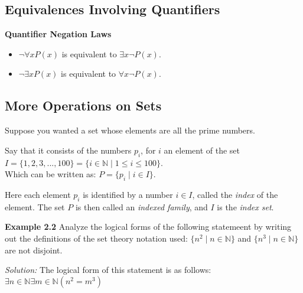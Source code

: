 \documentclass[11pt]{article}
\begin{document}
\subsection{Equivalences Involving Quantifiers}
\textbf{Quantifier Negation Laws}
\begin{itemize}
    \item $\neg\forall x P(x)$ is equivalent to $\exists x \neg P(x)$.
    \item $\neg\exists x P(x)$ is equivalent to $\forall x \neg P(x)$.
\end{itemize}

\subsection{More Operations on Sets}
Suppose you wanted a set whose elements are all the prime numbers.
\begin{center}
    Say that it consists of the numbers $p_i$, for $i$ an element of the set $I = \{1, 2, 3,...,100\} = \{ i \in \mathds{N} \mid 1 \leq i \leq 100 \}$. \\
    Which can be written as: $P = \{p_i \mid i \in I \}$. 
\end{center}
Here each element $p_i$ is identified by a number $i \in I$, called the \textit{index} of the element. The set $P$ is then called an \textit{indexed family}, and $I$ is the \textit{index set}. 

\textbf{Example 2.2} Analyze the logical forms of the following statemeent by writing out the definitions of the set theory notation used: 
$\{n^2 \mid n \in \mathds{N}\}$ and $ \{n^3 \mid n \in \mathds{N} \}$ are not disjoint.
\begin{center}
    \textit{Solution:} The logical form of this statement is as follows: \\
    $\exists n \in \mathds{N} \exists m \in \mathds{N} (n^2 = m^3)$
\end{center}
\end{document}
